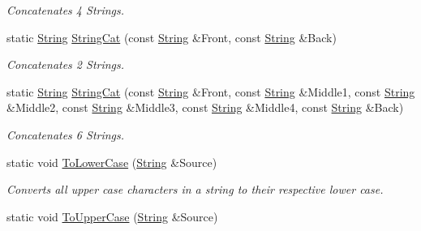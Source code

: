 \begin{DoxyCompactItemize}
\begin{DoxyCompactList}\small\item\em Concatenates 4 Strings. \item\end{DoxyCompactList}\item 
static \hyperlink{namespaceMezzanine_acf9fcc130e6ebf08e3d8491aebcf1c86}{String} \hyperlink{classMezzanine_1_1StringTool_a51f6de1d1d4f51c43c71a7b34bbfcfec}{StringCat} (const \hyperlink{namespaceMezzanine_acf9fcc130e6ebf08e3d8491aebcf1c86}{String} \&Front, const \hyperlink{namespaceMezzanine_acf9fcc130e6ebf08e3d8491aebcf1c86}{String} \&Back)
\begin{DoxyCompactList}\small\item\em Concatenates 2 Strings. \item\end{DoxyCompactList}\item 
static \hyperlink{namespaceMezzanine_acf9fcc130e6ebf08e3d8491aebcf1c86}{String} \hyperlink{classMezzanine_1_1StringTool_a5a4999eab8853b9b98b2e56f1c7dbc27}{StringCat} (const \hyperlink{namespaceMezzanine_acf9fcc130e6ebf08e3d8491aebcf1c86}{String} \&Front, const \hyperlink{namespaceMezzanine_acf9fcc130e6ebf08e3d8491aebcf1c86}{String} \&Middle1, const \hyperlink{namespaceMezzanine_acf9fcc130e6ebf08e3d8491aebcf1c86}{String} \&Middle2, const \hyperlink{namespaceMezzanine_acf9fcc130e6ebf08e3d8491aebcf1c86}{String} \&Middle3, const \hyperlink{namespaceMezzanine_acf9fcc130e6ebf08e3d8491aebcf1c86}{String} \&Middle4, const \hyperlink{namespaceMezzanine_acf9fcc130e6ebf08e3d8491aebcf1c86}{String} \&Back)
\begin{DoxyCompactList}\small\item\em Concatenates 6 Strings. \item\end{DoxyCompactList}\item 
static void \hyperlink{classMezzanine_1_1StringTool_a2d8ef1e6d8d320ec3086347ac9d59f7d}{ToLowerCase} (\hyperlink{namespaceMezzanine_acf9fcc130e6ebf08e3d8491aebcf1c86}{String} \&Source)
\begin{DoxyCompactList}\small\item\em Converts all upper case characters in a string to their respective lower case. \item\end{DoxyCompactList}\item 
static void \hyperlink{classMezzanine_1_1StringTool_a679376dd5968dcc42961227beeea4d3e}{ToUpperCase} (\hyperlink{namespaceMezzanine_acf9fcc130e6ebf08e3d8491aebcf1c86}{String} \&Source)

\end{DoxyCompactItemize}
